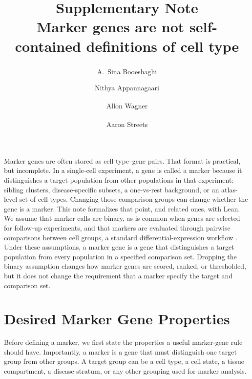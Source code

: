 \documentclass{article}
\begin{document}
\date{}
\title{\textbf{Supplementary Note}\\Marker genes are not self-contained definitions of cell type}
\author[1]{A.~Sina Booeshaghi\textsuperscript{\textdagger}}
\author[1]{Nithya Appannagaari}
\author[2,3,4]{Allon Wagner\textsuperscript{\textdagger}}
\author[1,3,4]{Aaron Streets\textsuperscript{\textdagger}}
\setlength{\affilsep}{2pt}
\maketitle
{}

Marker genes are often stored as cell type--gene pairs. That format is practical, but incomplete. In a single-cell experiment, a gene is called a marker because it distinguishes a target population from other populations in that experiment: sibling clusters, disease-specific subsets, a one-vs-rest background, or an atlas-level set of cell types. Changing those comparison groups can change whether the gene is a marker. This note formalizes that point, and related ones, with Lean. We assume that marker calls are binary, as is common when genes are selected for follow-up experiments, and that markers are evaluated through pairwise comparisons between cell groups, a standard differential-expression workflow \citep{Robinson_2009}. Under these assumptions, a marker gene is a gene that distinguishes a target population from every population in a specified comparison set. Dropping the binary assumption changes how marker genes are scored, ranked, or thresholded, but it does not change the requirement that a marker specify the target and comparison set.

\section{Desired Marker Gene Properties}

Before defining a marker, we first state the properties a useful marker-gene rule should have. Importantly, a marker is a gene that must distinguish one target group from other groups. A target group can be a cell type, a cell state, a tissue compartment, a disease stratum, or any other grouping used for marker analysis.
\end{document}
